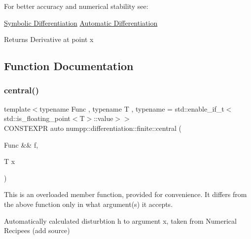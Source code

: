 For better accuracy and numerical stability see\+:

\hyperlink{group__numpp__differentiation__symbolic}{Symbolic Differentiation} \hyperlink{group__numpp__differentiation__automatic}{Automatic Differentiation}

\begin{DoxyReturn}{Returns}
Derivative at point x
\end{DoxyReturn}


\subsection{Function Documentation}
\mbox{\label{group__numpp__differentiation__finite__central_ga310a47693c9fd648ccb763f452a813d0}} 
\subsubsection{\texorpdfstring{central()}{central()}}
{\footnotesize\ttfamily template$<$typename Func , typename T , typename  = std\+::enable\+\_\+if\+\_\+t$<$std\+::is\+\_\+floating\+\_\+point$<$\+T$>$\+::value$>$$>$ \\
C\+O\+N\+S\+T\+E\+X\+PR auto numpp\+::differentiation\+::finite\+::central (\begin{DoxyParamCaption}\item[{Func \&\&}]{f,  }\item[{T}]{x }\end{DoxyParamCaption})}

This is an overloaded member function, provided for convenience. It differs from the above function only in what argument(s) it accepts.

Automatically calculated disturbtion h to argument x, taken from Numerical Recipees (add source)